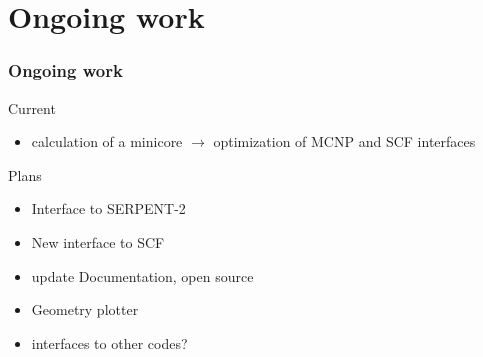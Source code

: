 \documentclass[t]{beamer}
\begin{document}
\section{Ongoing work}
\begin{frame}\frametitle{Ongoing work}

    \begin{block}{Current}
        \begin{itemize}
            \item calculation of a minicore $\rightarrow$ optimization of MCNP and SCF interfaces
        \end{itemize}
    \end{block}

    \begin{block}{Plans}
        \begin{itemize}
            \item Interface to SERPENT-2
            \item New interface to SCF
            \item update Documentation, open source
            \item Geometry plotter
            \item interfaces to other codes?
        \end{itemize}
    \end{block}

\end{frame}
\end{document}
